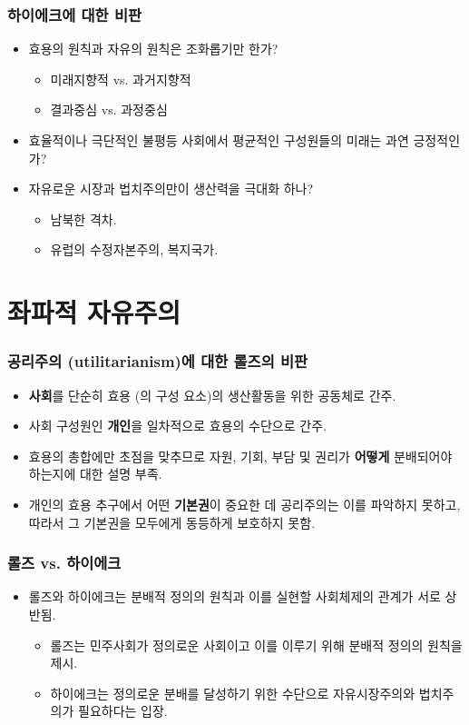 \documentclass[aspectratio=169,xcolor=dvipsnames,handout]{beamer}
\begin{document}
\begin{frame}[<+->]
\frametitle{하이에크에 대한 비판}
    \begin{itemize}
        \item 효용의 원칙과 자유의 원칙은 조화롭기만 한가?
        \begin{itemize}
            \item 미래지향적 vs. 과거지향적 
            \item 결과중심 vs. 과정중심
        \end{itemize}
        \item 효율적이나 극단적인 불평등 사회에서 평균적인 구성원들의 미래는 과연 긍정적인가?
        \item 자유로운 시장과 법치주의만이 생산력을 극대화 하나?
        \begin{itemize}
            \item 남북한 격차.
            \item 유럽의 수정자본주의, 복지국가.
        \end{itemize}
    \end{itemize}
\end{frame}

\section{좌파적 자유주의}%

\begin{frame}[<+->]
\frametitle{공리주의 (utilitarianism)에 대한 롤즈의 비판}
    \begin{itemize}
        \item \textbf{사회}를 단순히 효용 (의 구성 요소)의 생산활동을 위한 공동체로 간주.
        \item 사회 구성원인 \textbf{개인}을 일차적으로 효용의 수단으로 간주.
        \item 효용의 총합에만 초점을 맞추므로 자원, 기회, 부담 및 권리가 \textbf{어떻게} 분배되어야 하는지에 대한 설명 부족.
        \item 개인의 효용 추구에서 어떤 \textbf{기본권}이 중요한 데 공리주의는 이를 파악하지 못하고, 따라서 그 기본권을 모두에게 동등하게 보호하지 못함.
    \end{itemize}
\end{frame}
 
\begin{frame}[<+->]
\frametitle{롤즈 vs. 하이에크}
    \begin{itemize}
        \item 롤즈와 하이에크는 분배적 정의의 원칙과 이를 실현할 사회체제의 관계가 서로 상반됨.
        \begin{itemize}
            \item  롤즈는 민주사회가 정의로운 사회이고 이를 이루기 위해 분배적 정의의 원칙을 제시. 
            \item  하이에크는 정의로운 분배를 달성하기 위한 수단으로 자유시장주의와 법치주의가 필요하다는 입장. 
        \end{itemize}
    \end{itemize}
\end{frame}
\end{document}
